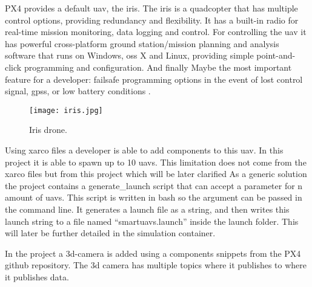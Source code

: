 PX4 provides a default \acs{uav}, the iris. 
The iris is a quadcopter that has multiple control options, providing redundancy and flexibility. 
It has a built-in radio for real-time mission monitoring, data logging and control. 
For controlling the \acs{uav} it has powerful cross-platform ground station/mission planning and 
analysis software that runs on Windows, \acp{os} X and Linux, providing simple point-and-click programming 
and configuration. And finally Maybe the most important feature for a developer: failsafe programming 
options in the event of lost control signal, \acp{gps}, or low battery conditions \cite{arducopter:iris}.

\begin{figure}[ht]
    \centering
    \texttt{[image: iris.jpg]}
    \caption[Iris drone]{Iris drone\footnotemark.}
\end{figure}

Using xarco files a developer is able to add components to this \acs{uav}. 
In this project it is able to spawn up to 10 \acp{uav}. This limitation does not come from the xarco files
but from this project which will be later clarified
As a generic solution the project contains a generate\_launch script 
that can accept a parameter for n amount of \acp{uav}. 
This script is written in bash so the argument can be passed in the command line. 
It generates a launch file as a string, and then writes this launch string to a file named 
“smartuavs.launch” inside the launch folder. This will later be further detailed in the simulation container.

In the project a \acs{3d}-camera is added using a components snippets from the PX4 github repository. The \acs{3d} camera has 
multiple topics where it publishes to where it publishes data.
